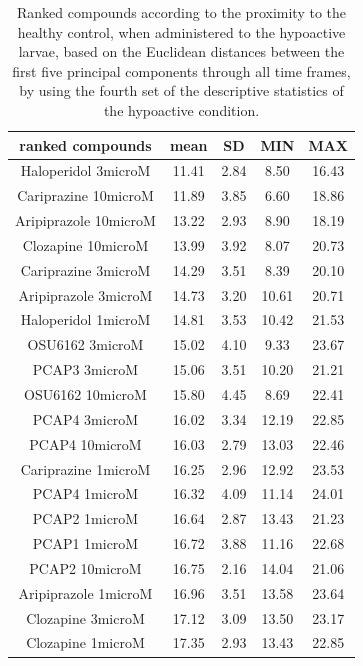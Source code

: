 \documentclass[a4paper,12pt]{article}
\begin{document}
\begin{table}[h!]\tiny
\centering
\caption{Ranked compounds according to the proximity to the healthy control, when administered to the hypoactive larvae, based on the Euclidean distances between the first five principal components through all time frames, by using the fourth set of the descriptive statistics of the hypoactive condition.}
\begin{tabular}{|c|c|c|c|c|}
\hline
ranked compounds             & mean & SD   & MIN  & MAX   \\ \hline
Haloperidol 3microM   & 11.41 & 2.84  & 8.50   & 16.43 \\ \hline
Cariprazine 10microM  & 11.89 & 3.85  & 6.60   & 18.86 \\ \hline
Aripiprazole 10microM & 13.22 & 2.93  & 8.90   & 18.19 \\ \hline
Clozapine 10microM    & 13.99 & 3.92  & 8.07  & 20.73 \\ \hline
Cariprazine 3microM   & 14.29 & 3.51  & 8.39  & 20.10  \\ \hline
Aripiprazole 3microM  & 14.73 & 3.20   & 10.61 & 20.71 \\ \hline
Haloperidol 1microM   & 14.81 & 3.53  & 10.42 & 21.53 \\ \hline
OSU6162 3microM       & 15.02 & 4.10   & 9.33  & 23.67 \\ \hline
PCAP3 3microM       & 15.06 & 3.51  & 10.20  & 21.21 \\ \hline
OSU6162 10microM      & 15.80  & 4.45  & 8.69  & 22.41 \\ \hline
PCAP4 3microM       & 16.02 & 3.34  & 12.19 & 22.85 \\ \hline
PCAP4 10microM      & 16.03 & 2.79  & 13.03 & 22.46 \\ \hline
Cariprazine 1microM   & 16.25 & 2.96  & 12.92 & 23.53 \\ \hline
PCAP4 1microM       & 16.32 & 4.09  & 11.14 & 24.01 \\ \hline
PCAP2 1microM         & 16.64 & 2.87  & 13.43 & 21.23 \\ \hline
PCAP1 1microM         & 16.72 & 3.88  & 11.16 & 22.68 \\ \hline
PCAP2 10microM        & 16.75 & 2.16  & 14.04 & 21.06 \\ \hline
Aripiprazole 1microM  & 16.96 & 3.51  & 13.58 & 23.64 \\ \hline
Clozapine 3microM     & 17.12 & 3.09  & 13.50  & 23.17 \\ \hline
Clozapine 1microM     & 17.35 & 2.93  & 13.43 & 22.85 \\ \hline

\end{tabular}
\end{table}
\end{document}
